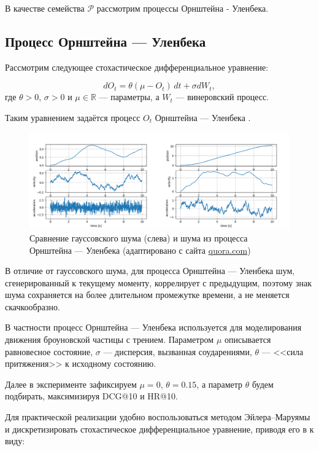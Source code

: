 \documentclass[14pt]{extarticle}
\begin{document}
В качестве семейства $\mathscr{P}$ рассмотрим процессы Орнштейна - Уленбека.

\subsection{Процесс Орнштейна — Уленбека}

Рассмотрим следующее стохастическое дифференциальное уравнение:

$$dO_{t}=\theta (\mu - O_{t})\,dt+\sigma dW_{t}, $$
где $\theta>0$, $\sigma >0$ и $\mu\in \mathbb{R}$ --- параметры, а $W_{t}$ --- винеровский процесс.

Таким уравнением задаётся процесс $O_{t}$ Орнштейна --- Уленбека \cite{Uhlenbeck30}.

\begin{figure}[h]
	\centering
	\includegraphics[width=1\textwidth]{img/ou_gauss.png}
	\caption{Сравнение гауссовского шума (слева) и шума из процесса Орнштейна --- Уленбека (адаптировано с сайта \href{https://www.quora.com/Why-do-we-use-the-Ornstein-Uhlenbeck-Process-in-the-exploration-of-DDPG}{quora.com})}
	\label{fig:ou}
\end{figure}

В отличие от гауссовского шума, для процесса Орнштейна --- Уленбека шум, сгенерированный к текущему моменту, коррелирует с предыдущим, поэтому знак шума сохраняется на более длительном промежутке времени, а не меняется скачкообразно. 

В частности процесс Орнштейна --- Уленбека используется для моделирования движения броуновской частицы с трением. Параметром $\mu$ описывается равновесное состояние, $\sigma$ --- дисперсия, вызванная соударениями, $\theta$ --- <<сила притяжения>> к исходному состоянию.

Далее в эксперименте зафиксируем $\mu=0$, $\theta = 0.15$, а параметр $\theta$ будем подбирать, максимизируя DCG@10 и HR@10.

Для практической реализации удобно воспользоваться методом Эйлера–Маруямы и дискретизировать стохастическое дифференциальное уравнение, приводя его в к виду:
\end{document}
